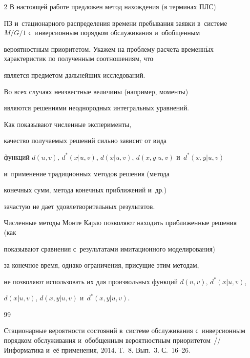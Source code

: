 \begin{multicols}{2}
В настоящей работе предложен метод нахождения (в терминах ПЛС)


ПЗ и~стационарного распределения времени пребывания заявки в~системе $M/G/1$ с~инверсионным порядком обслуживания и~обобщенным


вероятностным приоритетом. Укажем на проблему расчета временн$\acute{\mbox{ы}}$х характеристик по полученным соотношениям, что


является предметом дальнейших исследований.


Во всех случаях неизвестные величины (например, моменты)


являются решениями неоднородных интегральных уравнений.


Как показывают численные эксперименты,


качество получаемых решений сильно зависит от вида


функций $d(u,v)$, $d^*(x|u,v)$, $d(x|u,v)$, $d(x,y|u,v)$ и~$d^*(x,y|u,v)$


и~применение традиционных методов решения (метода


конечных сумм, метода конечных приближений и~др.)\


за\-час\-тую не дает удовлетворительных результатов.


Чис\-лен\-ные методы Мон\-те Кар\-ло позволяют находить приближенные решения (как


показывают сравнения с~результатами имитационного моделирования)


за конечное время, однако ограничения, присущие этим методам,


не позволяют использовать их для произвольных функций $d(u,v)$, $d^*(x|u,v)$,


$d(x|u,v)$, $d(x,y|u,v)$ и~$d^*(x,y|u,v)$.





{\small\frenchspacing


 {%




 \begin{thebibliography}{99}









Стационарные вероятности состояний в~системе обслуживания с~инверсионным порядком обслуживания и~обобщенным вероятностным приоритетом~// Информатика и~её применения, 2014. Т.~8. Вып.~3. С.~16--26.






\end{thebibliography}}}
\end{multicols}
